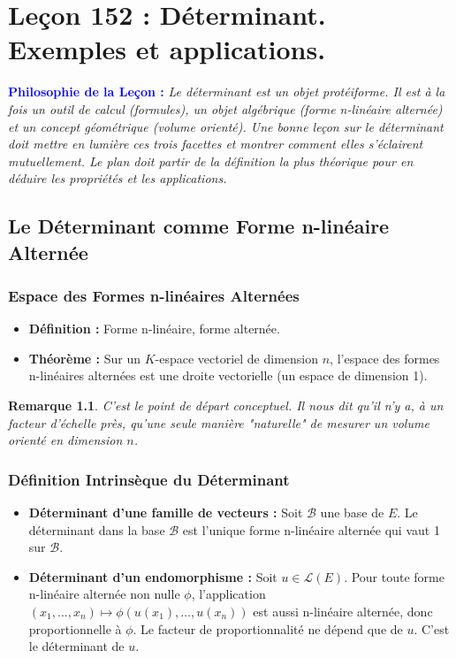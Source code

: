 \documentclass[12pt, a4paper, parskip=full]{report}
\theoremstyle{agregstyle}
\newtheorem{remark}[definition]{Remarque}
\newenvironment{philosophie}
  {\par\medskip\noindent\begin{oframed}\noindent\textbf{\textcolor{blue}{Philosophie de la Leçon :}}\itshape}
  {\end{oframed}\par\medskip}
\begin{document}
\chapter{Leçon 152 : Déterminant. Exemples et applications.}

\begin{philosophie}
    Le déterminant est un objet protéiforme. Il est à la fois un outil de calcul (formules), un objet algébrique (forme n-linéaire alternée) et un concept géométrique (volume orienté). Une bonne leçon sur le déterminant doit mettre en lumière ces trois facettes et montrer comment elles s'éclairent mutuellement. Le plan doit partir de la définition la plus théorique pour en déduire les propriétés et les applications.
\end{philosophie}

\section{Le Déterminant comme Forme n-linéaire Alternée}
\subsection{Espace des Formes n-linéaires Alternées}
\begin{itemize}
    \item \textbf{Définition :} Forme n-linéaire, forme alternée.
    \item \textbf{Théorème :} Sur un $K$-espace vectoriel de dimension $n$, l'espace des formes n-linéaires alternées est une droite vectorielle (un espace de dimension 1).
\end{itemize}
\begin{remark}
    C'est le point de départ conceptuel. Il nous dit qu'il n'y a, à un facteur d'échelle près, qu'une seule manière "naturelle" de mesurer un volume orienté en dimension $n$.
\end{remark}
\subsection{Définition Intrinsèque du Déterminant}
\begin{itemize}
    \item \textbf{Déterminant d'une famille de vecteurs :} Soit $\mathcal{B}$ une base de $E$. Le déterminant dans la base $\mathcal{B}$ est l'unique forme n-linéaire alternée qui vaut 1 sur $\mathcal{B}$.
    \item \textbf{Déterminant d'un endomorphisme :} Soit $u \in \mathcal{L}(E)$. Pour toute forme n-linéaire alternée non nulle $\phi$, l'application $(x_1, \dots, x_n) \mapsto \phi(u(x_1), \dots, u(x_n))$ est aussi n-linéaire alternée, donc proportionnelle à $\phi$. Le facteur de proportionnalité ne dépend que de $u$. C'est le déterminant de $u$.
\end{itemize}
\end{document}
